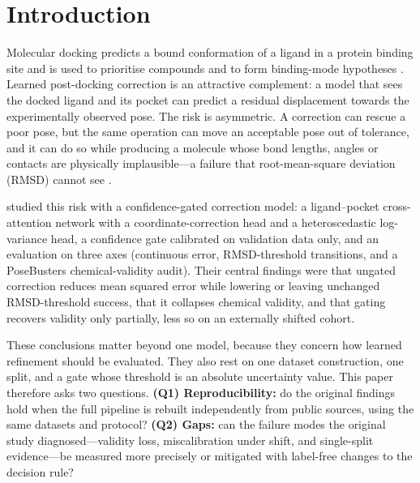 \section{Introduction}
Molecular docking predicts a bound conformation of a ligand in a protein binding site and is used to prioritise
compounds and to form binding-mode hypotheses \citep{trott2010vina,eberhardt2021vina,pagadala2017review}.
Learned post-docking correction is an attractive complement: a model that sees the docked ligand and its pocket
can predict a residual displacement towards the experimentally observed pose. The risk is asymmetric. A
correction can rescue a poor pose, but the same operation can move an acceptable pose out of tolerance, and it can
do so while producing a molecule whose bond lengths, angles or contacts are physically implausible---a failure that
root-mean-square deviation (RMSD) cannot see \citep{buttenschoen2024posebusters}.

\citet{mwamughunda2026original} studied this risk with a confidence-gated correction model: a ligand--pocket
cross-attention network with a coordinate-correction head and a heteroscedastic log-variance head, a confidence
gate calibrated on validation data only, and an evaluation on three axes (continuous error, RMSD-threshold
transitions, and a PoseBusters chemical-validity audit). Their central findings were that ungated correction
reduces mean squared error while lowering or leaving unchanged RMSD-threshold success, that it collapses chemical
validity, and that gating recovers validity only partially, less so on an externally shifted cohort.

These conclusions matter beyond one model, because they concern how learned refinement should be evaluated. They
also rest on one dataset construction, one split, and a gate whose threshold is an absolute uncertainty value. This
paper therefore asks two questions. \textbf{(Q1) Reproducibility:} do the original findings hold when the full
pipeline is rebuilt independently from public sources, using the same datasets and protocol? \textbf{(Q2) Gaps:}
can the failure modes the original study diagnosed---validity loss, miscalibration under shift, and single-split
evidence---be measured more precisely or mitigated with label-free changes to the decision rule?

